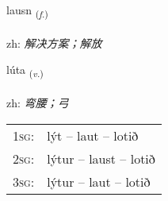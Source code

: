 \documentclass[frontgrid, backgrid]{flacards}\usepackage[]{graphicx}\usepackage[]{color}
\begin{document}
\renewcommand{\blhead}{\vskip5pt {\small\bfseries\footnotesize Nafnorð | 名词 }}
\renewcommand{\bcfoot}{\vskip5pt \hspace{2pt}{\small\bfseries\footnotesize 2K}}


{lausn \small{\textsubscript{(\textit{f.})}} \\[1ex] %
\textphonetic{[lœistn̥]} \\
zh: \emph{解决方案；解放} \\  [2ex]
\renewcommand*{\arraystretch}{0.8}
}

\renewcommand{\flhead}{\vskip5pt \fboxsep=0pt {\small\bfseries\footnotesize Sagnorð | 动词}}
\renewcommand{\fcfoot}{\vskip5pt \fboxsep=0pt \hspace{2pt}{\small\bfseries\footnotesize 2K}}

\renewcommand{\blhead}{\vskip5pt {\small\bfseries\footnotesize Sagnorð | 动词 }}
\renewcommand{\bcfoot}{\vskip5pt \hspace{2pt}{\small\bfseries\footnotesize 2K}}


{lúta \small{\textsubscript{(\textit{v.})}} \\[1ex] %
\textphonetic{[luːta]} \\
zh: \emph{弯腰；弓} \\  [2ex]
\renewcommand*{\arraystretch}{0.8}
\begin{tabular}{p{1cm}l}
\textsc{1sg}: & lýt -- laut -- lotið \\ 
\textsc{2sg}: & lýtur -- laust -- lotið \\ 
\textsc{3sg}: & lýtur -- laut -- lotið \\ 
\end{tabular}
}

\renewcommand{\flhead}{\vskip5pt \fboxsep=0pt {\small\bfseries\footnotesize Nafnorð | 名词}}
\renewcommand{\fcfoot}{\vskip5pt \fboxsep=0pt \hspace{2pt}{\small\bfseries\footnotesize 2K}}
\end{document}
